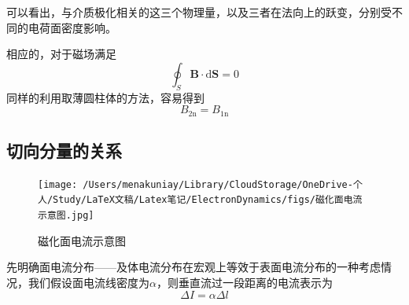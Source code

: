 			可以看出，与介质极化相关的这三个物理量，以及三者在法向上的跃变，分别受不同的电荷面密度影响。

			相应的，对于磁场满足
			\begin{equation}
				\oint_{S} \boldsymbol{B} \cdot \mathrm{d} \boldsymbol{S}=0
			\end{equation}
			同样的利用取薄圆柱体的方法，容易得到
			\begin{equation}
				B_{2 \mathrm{n}}=B_{1 \mathrm{n}}
			\end{equation}
		\subsection{切向分量的关系}
		\begin{figure}%
	      \centering
	      \texttt{[image: /Users/menakuniay/Library/CloudStorage/OneDrive-个人/Study/LaTeX文稿/Latex笔记/ElectronDynamics/figs/磁化面电流示意图.jpg]}
	      \caption{磁化面电流示意图}
	      \end{figure}
			先明确面电流分布——及体电流分布在宏观上等效于表面电流分布的一种考虑情况，我们假设面电流线密度为$\alpha$，则垂直流过一段距离的电流表示为
			\begin{equation}
				\Delta I=\alpha \Delta l
			\end{equation}





		













